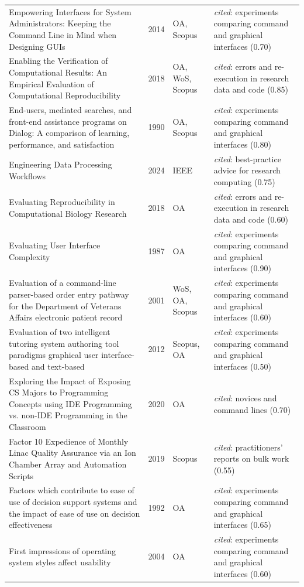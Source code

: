 \begin{longtable}{@{}%
  >{\raggedright\arraybackslash}p{}c%
  >{\raggedright\arraybackslash}p{}%
  >{\raggedright\arraybackslash}p{}@{}}
Empowering Interfaces for System Administrators: Keeping the Command Line in Mind when Designing GUIs & 2014 & OA, Scopus & \emph{cited}: experiments comparing command and graphical interfaces (0.70) \\
Enabling the Verification of Computational Results: An Empirical Evaluation of Computational Reproducibility & 2018 & OA, WoS, Scopus & \emph{cited}: errors and re-execution in research data and code (0.85) \\
End-users, mediated searches, and front-end assistance programs on Dialog: A comparison of learning, performance, and satisfaction & 1990 & OA, Scopus & \emph{cited}: experiments comparing command and graphical interfaces (0.80) \\
Engineering Data Processing Workflows & 2024 & IEEE & \emph{cited}: best-practice advice for research computing (0.75) \\
Evaluating Reproducibility in Computational Biology Research & 2018 & OA & \emph{cited}: errors and re-execution in research data and code (0.60) \\
Evaluating User Interface Complexity & 1987 & OA & \emph{cited}: experiments comparing command and graphical interfaces (0.90) \\
Evaluation of a command-line parser-based order entry pathway for the Department of Veterans Affairs electronic patient record & 2001 & WoS, OA, Scopus & \emph{cited}: experiments comparing command and graphical interfaces (0.60) \\
Evaluation of two intelligent tutoring system authoring tool paradigms graphical user interface-based and text-based & 2012 & Scopus, OA & \emph{cited}: experiments comparing command and graphical interfaces (0.50) \\
Exploring the Impact of Exposing CS Majors to Programming Concepts using IDE Programming vs. non-IDE Programming in the Classroom & 2020 & OA & \emph{cited}: novices and command lines (0.70) \\
Factor 10 Expedience of Monthly Linac Quality Assurance via an Ion Chamber Array and Automation Scripts & 2019 & Scopus & \emph{cited}: practitioners' reports on bulk work (0.55) \\
Factors which contribute to ease of use of decision support systems and the impact of ease of use on decision effectiveness & 1992 & OA & \emph{cited}: experiments comparing command and graphical interfaces (0.65) \\
First impressions of operating system styles affect usability & 2004 & OA & \emph{cited}: experiments comparing command and graphical interfaces (0.60) \\

\end{longtable}
